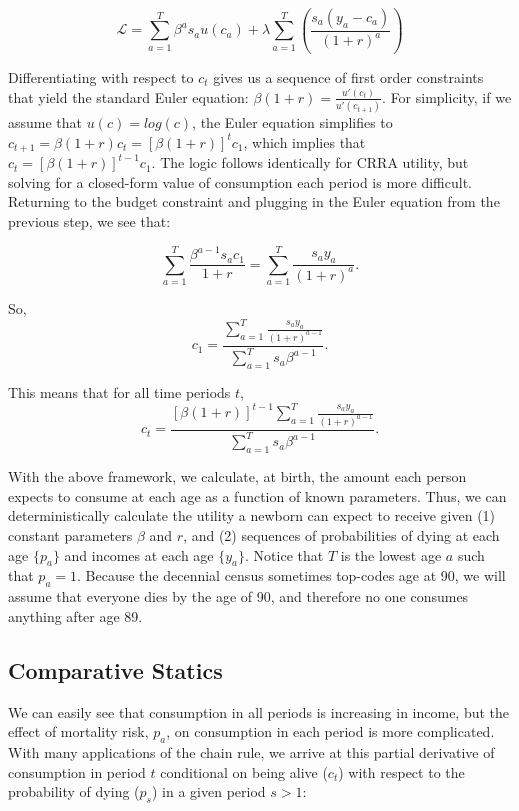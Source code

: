 \documentclass[12pt]{article}
\begin{document}
\[\mathcal{L} = \sum\limits_{a=1}^T \beta^as_au(c_a) +\lambda \sum\limits_{a=1}^T \left( \frac{s_a(y_a-c_a)}{(1+r)^a}\right) \]

\noindent Differentiating with respect to $c_t$ gives us a sequence of first order constraints that yield the standard Euler equation: $\beta (1+r) = \frac{u'(c_t)}{u'(c_{t+1})}$. 
For simplicity, if we assume that $u(c)=log(c)$, the Euler equation simplifies to $c_{t+1}=\beta (1+r) c_t=[\beta (1+r)]^{t}c_1$, which implies that $c_t=[\beta (1+r)]^{t-1}c_1$. 
The logic follows identically for CRRA utility, but solving for a closed-form value of consumption each period is more difficult. 
Returning to the budget constraint and plugging in the Euler equation from the previous step, we see that: 

\[\sum\limits_{a=1}^T \frac{\beta^{a-1}s_ac_1}{1+r} =  \sum\limits_{a=1}^T \frac{s_ay_a}{(1+r)^a}. \]

\noindent So, \[c_1=\frac{\sum\limits_{a=1}^T \frac{s_ay_a}{(1+r)^{a-1}}}{\sum\limits_{a=1}^T s_a\beta^{a-1}}. \]

\noindent This means that for all time periods $t$, \[ c_t=\frac{[\beta(1+r)]^{t-1} \sum\limits_{a=1}^T \frac{s_ay_a}{(1+r)^{a-1}}}{\sum\limits_{a=1}^T s_a\beta^{a-1}}. \]

\noindent With the above framework, we calculate, at birth, the amount each person expects to consume at each age as a function of known parameters. 
Thus, we can deterministically calculate the utility a newborn can expect to receive given (1) constant parameters $\beta$ and $r$, and (2) sequences of probabilities of dying at each age $\{p_a\}$ and incomes at each age $\{y_a\}$. 
Notice that $T$ is the lowest age $a$ such that $p_a=1$. 
Because the decennial census sometimes top-codes age at 90, we will assume that everyone dies by the age of 90, and therefore no one consumes anything after age 89.

\subsection{Comparative Statics}

We can easily see that consumption in all periods is increasing in income, but the effect of mortality risk, $p_a$, on consumption in each period is more complicated. 
With many applications of the chain rule, we arrive at this partial derivative of consumption in period $t$ conditional on being alive ($c_t$) with respect to the probability of dying ($p_s$) in a given period $s>1$:
\end{document}
